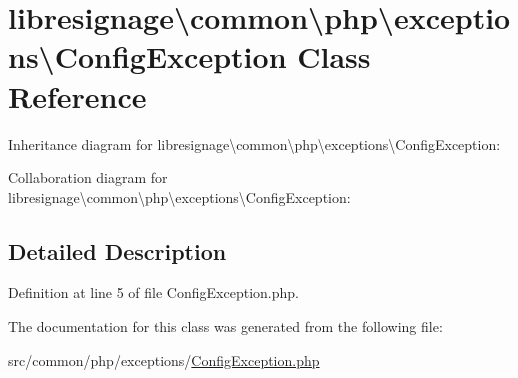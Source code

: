 \hypertarget{classlibresignage_1_1common_1_1php_1_1exceptions_1_1ConfigException}{}\section{libresignage\textbackslash{}common\textbackslash{}php\textbackslash{}exceptions\textbackslash{}Config\+Exception Class Reference}
\label{classlibresignage_1_1common_1_1php_1_1exceptions_1_1ConfigException}


Inheritance diagram for libresignage\textbackslash{}common\textbackslash{}php\textbackslash{}exceptions\textbackslash{}Config\+Exception\+:


Collaboration diagram for libresignage\textbackslash{}common\textbackslash{}php\textbackslash{}exceptions\textbackslash{}Config\+Exception\+:


\subsection{Detailed Description}


Definition at line 5 of file Config\+Exception.\+php.



The documentation for this class was generated from the following file\+:\begin{DoxyCompactItemize}
\item 
src/common/php/exceptions/\hyperlink{ConfigException_8php}{Config\+Exception.\+php}\end{DoxyCompactItemize}
